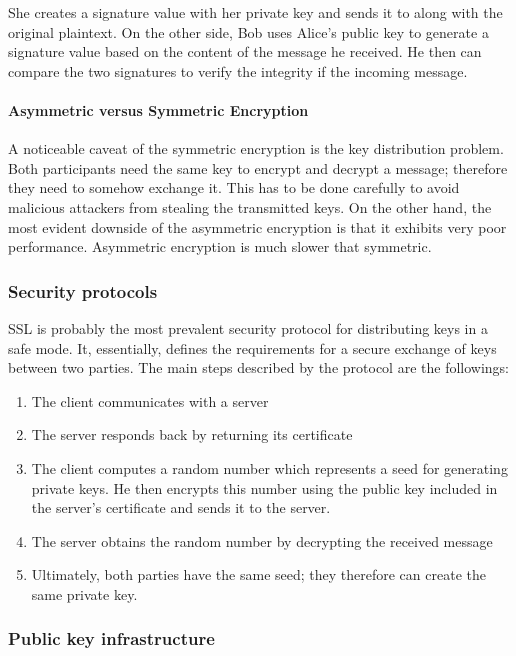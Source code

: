 She creates a signature value with her private key and sends it to along with the original plaintext. On the other side, Bob uses Alice's public key to generate a signature value based on the content of the message he received. He then can compare the two signatures to verify the integrity if the incoming message.

\paragraph{Asymmetric versus Symmetric Encryption}

A noticeable caveat of the symmetric encryption is the key distribution problem. Both participants need the same key to encrypt and decrypt a message; therefore they need to somehow exchange it. This has to be done carefully to avoid malicious attackers from stealing the transmitted keys. On the other hand, the most evident downside of the asymmetric encryption is that it exhibits very poor performance. Asymmetric encryption is much slower that symmetric.

\subsubsection{Security protocols}

SSL is probably the most prevalent security protocol for distributing keys in a safe mode. It, essentially, defines the requirements for a secure exchange of keys between two parties. The main steps described by the protocol are the followings:

\begin{enumerate}
  \item 
        The client communicates with a server
  \item 
        The server responds back by returning its certificate
  \item 
        The client computes a random number which represents a seed for generating private keys. He then encrypts this number using the public key included in the server's certificate and sends it to the server.
  \item 
        The server obtains the random number by decrypting the received message
  \item 
        Ultimately, both parties have the same seed; they therefore can create the same private key.
\end{enumerate}

\subsubsection{Public key infrastructure}

